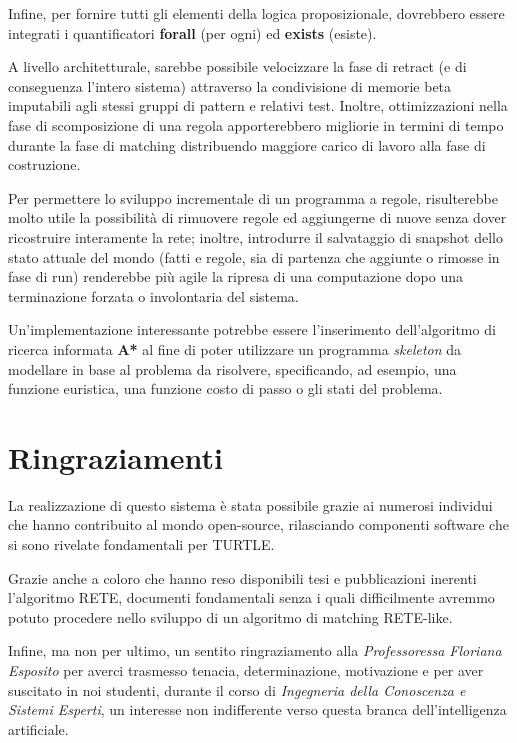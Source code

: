 Infine, per fornire tutti gli elementi della logica proposizionale, dovrebbero essere integrati i quantificatori \textbf{forall} (per ogni) ed \textbf{exists} (esiste).

A livello architetturale, sarebbe possibile velocizzare la fase di retract (e di conseguenza l'intero sistema) attraverso la condivisione di memorie beta imputabili agli stessi gruppi di pattern e relativi test. Inoltre, ottimizzazioni nella fase di scomposizione di una regola apporterebbero migliorie in termini di tempo durante la fase di matching distribuendo maggiore carico di lavoro alla fase di costruzione.

Per permettere lo sviluppo incrementale di un programma a regole, risulterebbe molto utile la possibilità di rimuovere regole ed aggiungerne di nuove senza dover ricostruire interamente la rete; inoltre, introdurre il salvataggio di snapshot dello stato attuale del mondo (fatti e regole, sia di partenza che aggiunte o rimosse in fase di run) renderebbe più agile la ripresa di una computazione dopo una terminazione forzata o involontaria del sistema.

Un'implementazione interessante potrebbe essere l'inserimento dell'algoritmo di ricerca informata \textbf{A*} al fine di poter utilizzare un programma \emph{skeleton} da modellare in base al problema da risolvere, specificando, ad esempio, una funzione euristica, una funzione costo di passo o gli stati del problema.

\section{Ringraziamenti}

La realizzazione di questo sistema è stata possibile grazie ai numerosi individui che hanno contribuito al mondo open-source, rilasciando componenti software che si sono rivelate fondamentali per TURTLE.

Grazie anche a coloro che hanno reso disponibili tesi e pubblicazioni inerenti l'algoritmo RETE, documenti fondamentali senza i quali difficilmente avremmo potuto procedere nello sviluppo di un algoritmo di matching RETE-like. 

Infine, ma non per ultimo, un sentito ringraziamento alla \emph{Professoressa Floriana Esposito} per averci trasmesso tenacia, determinazione, motivazione e per aver suscitato in noi studenti, durante il corso di \emph{Ingegneria della Conoscenza e Sistemi Esperti}, un interesse non indifferente verso questa branca dell'intelligenza artificiale.

